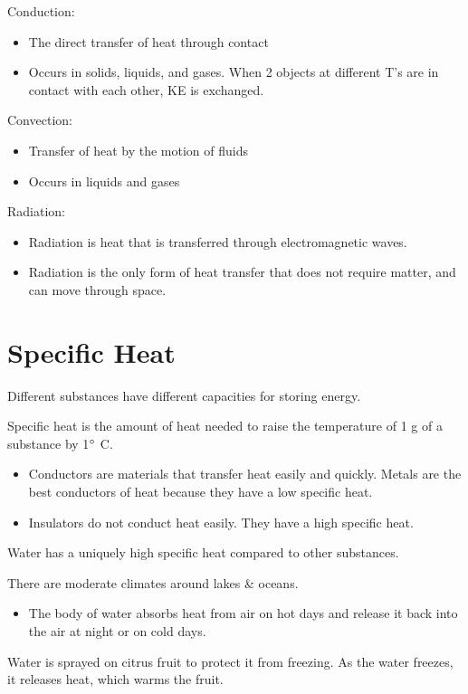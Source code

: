 \documentclass[../hchem.tex]{subfiles}
\begin{document}
Conduction:
\begin{itemize}
    \item The direct transfer of heat through contact 
    \item Occurs in solids, liquids, and gases. When 2 objects at different T's are in contact with each other, KE is exchanged.
\end{itemize}

Convection:
\begin{itemize}
    \item Transfer of heat by the motion of fluids 
    \item Occurs in liquids and gases 
\end{itemize}

Radiation:
\begin{itemize}
    \item Radiation is heat that is transferred through electromagnetic waves.
    \item Radiation is the only form of heat transfer that does not require matter, and can move through space.
\end{itemize}
\section{Specific Heat}
Different substances have different capacities for storing energy.

Specific heat is the amount of heat needed to raise the temperature of 1 g of a substance by 1$\degree$ C.

\begin{itemize}
    \item Conductors are materials that transfer heat easily and quickly. Metals are the best conductors of heat because they have a low specific heat.
    \item Insulators do not conduct heat easily. They have a high specific heat.
\end{itemize}

Water has a uniquely high specific heat compared to other substances.

There are moderate climates around lakes \& oceans.
\begin{itemize}
    \item The body of water absorbs heat from air on hot days and release it back into the air at night or on cold days.
\end{itemize}

Water is sprayed on citrus fruit to protect it from freezing. As the water freezes, it releases heat, which warms the fruit.
\end{document}
